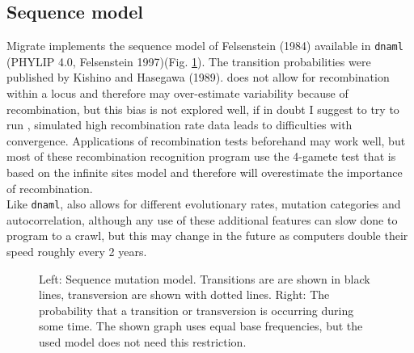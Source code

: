 \subsection{Sequence model}
Migrate implements the sequence model of Felsenstein (1984)  available in {\texttt{dnaml}} (PHYLIP 4.0, Felsenstein 1997)(Fig. \ref{SEQFIG}). The transition probabilities were published by Kishino and Hasegawa (1989).  {\migrate} does not allow for recombination within a locus and therefore may over-estimate variability because of recombination, but this bias is not explored well, if in doubt I suggest to try to run \migrate, simulated high recombination rate data leads to difficulties with convergence. Applications of recombination tests beforehand may work well, but most of these recombination recognition program use the 4-gamete test that is based on the infinite sites model and therefore will overestimate the importance of recombination.\\
Like {\texttt{dnaml}}, {\migrate} also allows for different evolutionary rates, mutation categories and autocorrelation, although
any use of these additional features can slow done to program to a crawl, but this may change
in the future as computers double their speed roughly every 2 years.
\begin{figure}[b]
\begin{center}
\end{center}
\caption{Left: Sequence mutation model. 
Transitions are are shown in black lines, transversion are 
shown with dotted lines.
Right: The probability that a transition or transversion is occurring during some time.
The shown graph uses equal base frequencies, but the used model does not need this restriction.}
\label{SEQFIG}
\end{figure}
